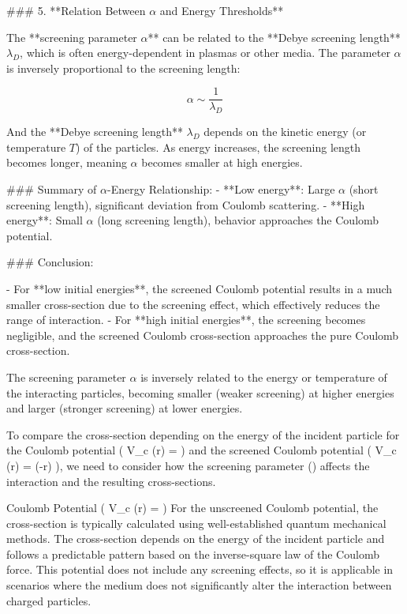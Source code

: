 ### 5. **Relation Between \( \alpha \) and Energy Thresholds**

The **screening parameter \( \alpha \)** can be related to the **Debye screening length** \( \lambda_D \), which is often energy-dependent in plasmas or other media. The parameter \( \alpha \) is inversely proportional to the screening length:

\[
\alpha \sim \frac{1}{\lambda_D}
\]

And the **Debye screening length** \( \lambda_D \) depends on the kinetic energy (or temperature \( T \)) of the particles. As energy increases, the screening length becomes longer, meaning \( \alpha \) becomes smaller at high energies.

### Summary of \( \alpha \)-Energy Relationship:
- **Low energy**: Large \( \alpha \) (short screening length), significant deviation from Coulomb scattering.
- **High energy**: Small \( \alpha \) (long screening length), behavior approaches the Coulomb potential.

### Conclusion:

- For **low initial energies**, the screened Coulomb potential results in a much smaller cross-section due to the screening effect, which effectively reduces the range of interaction.
- For **high initial energies**, the screening becomes negligible, and the screened Coulomb cross-section approaches the pure Coulomb cross-section.
  
The screening parameter \( \alpha \) is inversely related to the energy or temperature of the interacting particles, becoming smaller (weaker screening) at higher energies and larger (stronger screening) at lower energies.

To compare the cross-section depending on the energy of the incident particle for the Coulomb potential ( V_c (r) =  ) and the screened Coulomb potential ( V_c (r) =  \exp(-\alpha r) ), we need to consider how the screening parameter (\alpha) affects the interaction and the resulting cross-sections.

Coulomb Potential ( V_c (r) =  )
For the unscreened Coulomb potential, the cross-section is typically calculated using well-established quantum mechanical methods. The cross-section depends on the energy of the incident particle and follows a predictable pattern based on the inverse-square law of the Coulomb force. This potential does not include any screening effects, so it is applicable in scenarios where the medium does not significantly alter the interaction between charged particles.

